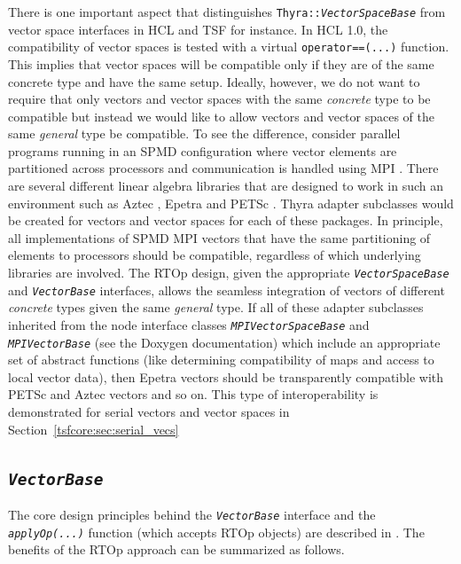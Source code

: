 \documentclass[pdf,ps2pdf,11pt]{SANDreport}
\begin{document}
There is one important aspect that distinguishes
{}\texttt{Thyra\-::\textit{Vector\-Space\-Base}} from vector space interfaces
in HCL and TSF for instance.  In HCL 1.0, the compatibility of vector spaces
is tested with a virtual {}\texttt{operator==(...)}  function.  This implies
that vector spaces will be compatible only if they are of the same concrete
type and have the same setup.  Ideally, however, we do not want to require
that only vectors and vector spaces with the same {\em concrete} type to be
compatible but instead we would like to allow vectors and vector spaces of the
same {\em general} type be compatible.  To see the difference, consider
parallel programs running in an SPMD configuration where vector elements are
partitioned across processors and communication is handled using MPI
{}\cite{ref:mpi}.  There are several different linear algebra libraries that
are designed to work in such an environment such as Aztec {}\cite{sd:aztec},
Epetra {}\cite{ref:Epetra} and PETSc {}\cite{ref:petsc}.  Thyra adapter
subclasses would be created for vectors and vector spaces for each of these
packages.  In principle, all implementations of SPMD MPI vectors that have the
same partitioning of elements to processors should be compatible, regardless
of which underlying libraries are involved.  The RTOp design, given the
appropriate {}\texttt{\textit{Vector\-Space\-Base}} and
{}\texttt{\textit{Vector\-Base}} interfaces, allows the seamless integration
of vectors of different {\em concrete} types given the same {\em general}
type.  If all of these adapter subclasses inherited from the node interface
classes {}\texttt{\textit{MPIVectorSpaceBase}} and
{}\texttt{\textit{MPIVectorBase}} (see the Doxygen documentation) which
include an appropriate set of abstract functions (like determining
compatibility of maps and access to local vector data), then Epetra vectors
should be transparently compatible with PETSc and Aztec vectors and so on.
This type of interoperability is demonstrated for serial vectors and vector
spaces in Section~\ref{tsfcore:sec:serial_vecs}

%
\subsection{\texttt{\textit{Vector\-Base}}}
\label{tsfcore:sec:vector}
%

The core design principles behind the {}\texttt{\textit{Vector\-Base}}
interface and the {}\texttt{\textit{applyOp(\-...)}} function (which
accepts RTOp objects) are described in {}\cite{ref:rtop_toms}.  The
benefits of the RTOp approach can be summarized as follows.
\end{document}
